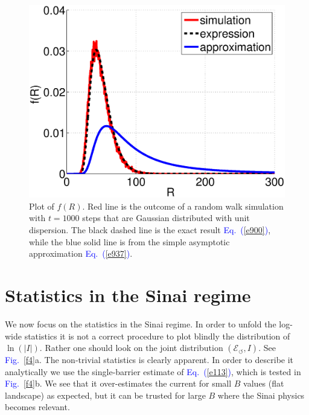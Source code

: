 \documentclass[aps,pre,floats,floatfix,twocolumn]{revtex4}
\newcommand{\Eq}[1]{\textcolor{blue}{Eq.\!\!~(\ref{#1})}}
\newcommand{\Fig}[1]{\textcolor{blue}{Fig.}\!\!~\ref{#1}}
\begin{document}
\begin{figure}

\includegraphics[width=\hsize]{PB_sim.eps}

\caption{
Plot of $f(R)$. Red line is the outcome of a random walk simulation with ${t=1000}$ 
steps that are Gaussian distributed with unit dispersion.   
The black dashed line is the exact result \Eq{e900}, 
while the blue solid line is from the simple asymptotic approximation \Eq{e937}.} 

\label{fb}
\end{figure}






\section{Statistics in the Sinai regime}
\label{sec:in}

We now focus on the statistics in the Sinai regime. 
In order to unfold the log-wide statistics it is 
not a correct procedure to plot blindly the distribution 
of $\ln(|I|)$. Rather one should look on the joint 
distribution ${(\mathcal{E}_{\circlearrowleft},I)}$. 
See \Fig{f4}a. The non-trivial statistics is clearly apparent.
In order to describe it analytically we use 
the single-barrier estimate of \Eq{e113}, 
which is tested in \Fig{f4}b. We see that it 
over-estimates the current for small $B$ values 
(flat landscape) as expected, but it can be trusted 
for large $B$ where the Sinai physics becomes relevant. 
\end{document}

